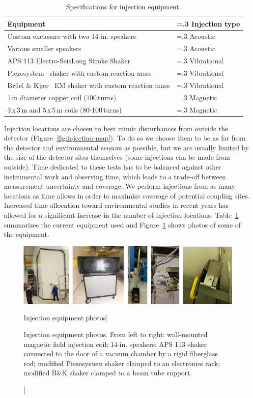 \begin{table}[h!]
	\centering%
	\caption{\label{tab:injectors}Specifications for injection equipment.}
	\begin{tabularx}{\linewidth}{X>{\hsize=.3\hsize}X}
		\toprule
		Equipment & Injection type \\
		\midrule
		Custom enclosure with two 14-in. speakers & Acoustic\\
		Various smaller speakers & Acoustic\\
		APS 113 Electro-Seis\reg Long Stroke Shaker~\citep{big_shaker} & Vibrational\\
		Piezosystem\reg~\citep{piezo} shaker with custom reaction mass & Vibrational\\
		Br\"uel \& Kj\ae r\reg~\citep{bk} EM shaker with custom reaction mass & Vibrational\\
		1\,m diameter copper coil (100\,turns) & Magnetic\\
		3\,x\,3\,m and 5\,x\,5\,m coils (80-100\,turns) & Magnetic\\
		\bottomrule
	\end{tabularx}
\end{table}


Injection locations are chosen to best mimic disturbances from outside the detector (Figure~\ref{fig:injection-map}).
To do so we choose them to be as far from the detector and environmental sensors as possible, but we are usually limited by the size of the detector sites themselves (some injections can be made from outside).
Time dedicated to these tests has to be balanced against other instrumental work and observing time, which leads to a trade-off between measurement uncertainty and coverage.
We perform injections from as many locations as time allows in order to maximize coverage of potential coupling sites.
Increased time allocation toward environmental studies in recent years has allowed for a significant increase in the number of injection locations.
Table~\ref{tab:injectors} summarizes the current equipment used and Figure~\ref{fig:injection-equipment} shows photos of some of the equipment.

\begin{figure}[h!]
	\centering
	\includegraphics[width=\textwidth]{figures/noise-methods/injection-equipment.png}
	\caption
	[Injection equipment photos]
	{\raggedright
	Injection equipment photos. From left to right: wall-mounted magnetic field injection coil; 14-in. speakers; APS 113 shaker connected to the door of a vacuum chamber by a rigid fiberglass rod; modified Piezosystem shaker clamped to an electronics rack; modified B\&K shaker clamped to a beam tube support.}
	\label{fig:injection-equipment}
\end{figure}

